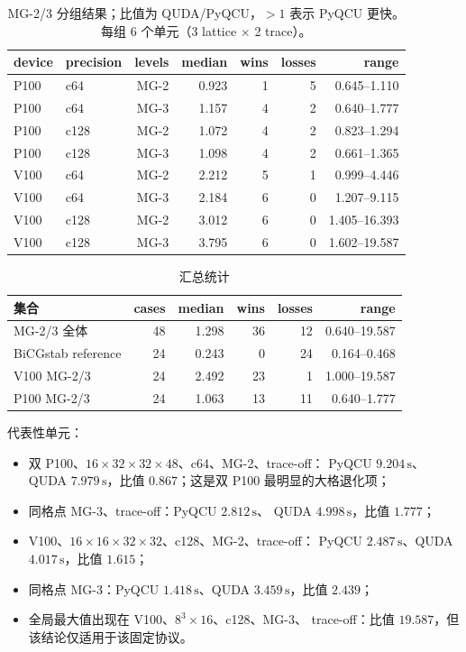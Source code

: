 \documentclass[UTF8,a4paper,11pt]{ctexart}
\begin{document}
\begin{table}[htbp]
\centering
\small
\caption{MG-2/3 分组结果；比值为 QUDA/PyQCU，\(>1\) 表示 PyQCU 更快。
每组 6 个单元（3 lattice \(\times\) 2 trace）。}
\begin{tabular}{llrrrrr}
\toprule
device & precision & levels & median & wins & losses & range \\
\midrule
P100 & c64 & MG-2 & 0.923 & 1 & 5 & 0.645--1.110 \\
P100 & c64 & MG-3 & 1.157 & 4 & 2 & 0.640--1.777 \\
P100 & c128 & MG-2 & 1.072 & 4 & 2 & 0.823--1.294 \\
P100 & c128 & MG-3 & 1.098 & 4 & 2 & 0.661--1.365 \\
V100 & c64 & MG-2 & 2.212 & 5 & 1 & 0.999--4.446 \\
V100 & c64 & MG-3 & 2.184 & 6 & 0 & 1.207--9.115 \\
V100 & c128 & MG-2 & 3.012 & 6 & 0 & 1.405--16.393 \\
V100 & c128 & MG-3 & 3.795 & 6 & 0 & 1.602--19.587 \\
\bottomrule
\end{tabular}
\end{table}

\begin{table}[htbp]
\centering
\small
\caption{汇总统计}
\begin{tabular}{lrrrrr}
\toprule
集合 & cases & median & wins & losses & range \\
\midrule
MG-2/3 全体 & 48 & 1.298 & 36 & 12 & 0.640--19.587 \\
BiCGstab reference & 24 & 0.243 & 0 & 24 & 0.164--0.468 \\
V100 MG-2/3 & 24 & 2.492 & 23 & 1 & 1.000--19.587 \\
P100 MG-2/3 & 24 & 1.063 & 13 & 11 & 0.640--1.777 \\
\bottomrule
\end{tabular}
\end{table}

代表性单元：
\begin{itemize}
\item 双 P100、\(16\times32\times32\times48\)、c64、MG-2、trace-off：
  PyQCU \(9.204\,\mathrm{s}\)、QUDA \(7.979\,\mathrm{s}\)，比值
  \(0.867\)；这是双 P100 最明显的大格退化项；
\item 同格点 MG-3、trace-off：PyQCU \(2.812\,\mathrm{s}\)、
  QUDA \(4.998\,\mathrm{s}\)，比值 \(1.777\)；
\item V100、\(16\times16\times32\times32\)、c128、MG-2、trace-off：
  PyQCU \(2.487\,\mathrm{s}\)、QUDA \(4.017\,\mathrm{s}\)，比值
  \(1.615\)；
\item 同格点 MG-3：PyQCU \(1.418\,\mathrm{s}\)、QUDA
  \(3.459\,\mathrm{s}\)，比值 \(2.439\)；
\item 全局最大值出现在 V100、\(8^3\times16\)、c128、MG-3、
  trace-off：比值 \(19.587\)，但该结论仅适用于该固定协议。
\end{itemize}
\end{document}
